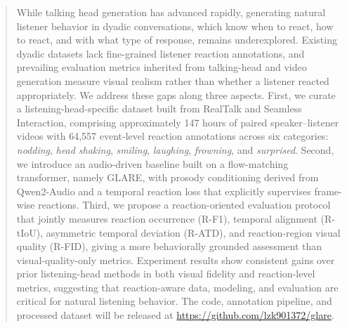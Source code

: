 \vspace{-1em}
\begin{abstract}
    While talking head generation has advanced rapidly, generating natural listener behavior in dyadic conversations, which know when to react, how to react, and with what type of response, remains underexplored. Existing dyadic datasets lack fine-grained listener reaction annotations, and prevailing evaluation metrics inherited from talking-head and video generation measure visual realism rather than whether a listener reacted appropriately. We address these gaps along three aspects. First, we curate a listening-head-specific dataset built from RealTalk and Seamless Interaction, comprising approximately 147 hours of paired speaker–listener videos with 64,557 event-level reaction annotations across six categories: \textit{nodding}, \textit{head shaking}, \textit{smiling}, \textit{laughing}, \textit{frowning}, and \textit{surprised}. Second, we introduce an audio-driven baseline built on a flow-matching transformer, namely GLARE, with prosody conditioning derived from Qwen2-Audio and a temporal reaction loss that explicitly supervises frame-wise reactions. Third, we propose a reaction-oriented evaluation protocol that jointly measures reaction occurrence (R-F1), temporal alignment (R-tIoU), asymmetric temporal deviation (R-ATD), and reaction-region visual quality (R-FID), giving a more behaviorally grounded assessment than visual-quality-only metrics. Experiment results show consistent gains over prior listening-head methods in both visual fidelity and reaction-level metrics, suggesting that reaction-aware data, modeling, and evaluation are critical for natural listening behavior. The code, annotation pipeline, and processed dataset will be released at \href{https://github.com/lzk901372/glare}{https://github.com/lzk901372/glare}.
\end{abstract}